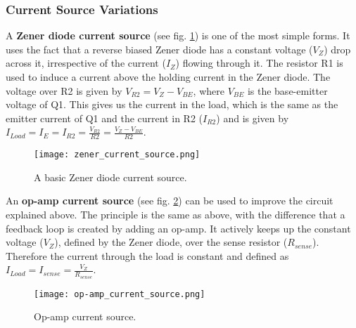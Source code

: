\subsubsection{Current Source Variations}
\label{sec:current_source}
A \textbf{Zener diode current source} (see fig. \ref{fig:zener_current_source}) is one of the most simple forms.
It uses the fact that a reverse biased Zener diode has a constant voltage ($V_Z$) drop across it, irrespective of the current ($I_Z$) flowing through it.
The resistor R1 is used to induce a current above the holding current in the Zener diode.
The voltage over R2 is given by $V_{R2} = V_Z - V_{BE}$, where $V_{BE}$ is the base-emitter voltage of Q1.
This gives us the current in the load, which is the same as the emitter current of Q1 and the current in R2 ($I_{R2}$) and is given by $I_{Load} = I_E = I_{R2} = \frac{V_{R2}}{R2} = \frac{V_Z-V_{BE}}{R2}$.
\begin{figure}[H]
    \centering
    \texttt{[image: zener\_current\_source.png]}
    \caption[Zener Current Source]{A basic Zener diode current source.\cite{wikipedia2016current}}
    \label{fig:zener_current_source}
\end{figure}

An \textbf{op-amp current source} (see fig. \ref{fig:op-amp_current_source}) can be used to improve the circuit explained above.
The principle is the same as above, with the difference that a feedback loop is created by adding an op-amp.
It actively keeps up the constant voltage ($V_Z$), defined by the Zener diode, over the sense resistor ($R_{sense}$).
Therefore the current through the load is constant and defined as $I_{Load} = I_{sense} = \frac{V_Z}{R_{sense}}$.
\begin{figure}[H]
    \centering
    \texttt{[image: op-amp\_current\_source.png]}
    \caption[Op-amp Current Source]{Op-amp current source.\cite{wikipedia2016current}}
    \label{fig:op-amp_current_source}
\end{figure}


